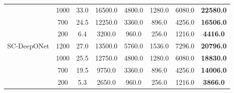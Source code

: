 \begin{table}[htbp]
\begin{tabular}{l|c|cc|ccc|c}
       & 1000 & 33.0 & 16500.0 & 4800.0 & 1280.0 & 6080.0 & \textbf{22580.0} \\
       & 700  & 24.5 & 12250.0 & 3360.0 & 896.0  & 4256.0 & \textbf{16506.0} \\
       & 200  & 6.4  & 3200.0  & 960.0  & 256.0  & 1216.0 & \textbf{4416.0}  \\
\hline
SC-DeepONet & 1200 & 27.0 & 13500.0 & 5760.0 & 1536.0 & 7296.0 & \textbf{20796.0} \\
            & 1000 & 25.5 & 12750.0 & 4800.0 & 1280.0 & 6080.0 & \textbf{18830.0} \\
            & 700  & 19.5 & 9750.0  & 3360.0 & 896.0  & 4256.0 & \textbf{14006.0} \\
            & 200  & 5.3  & 2650.0  & 960.0  & 256.0  & 1216.0 & \textbf{3866.0}  \\
\hline
\end{tabular}
\end{table}




